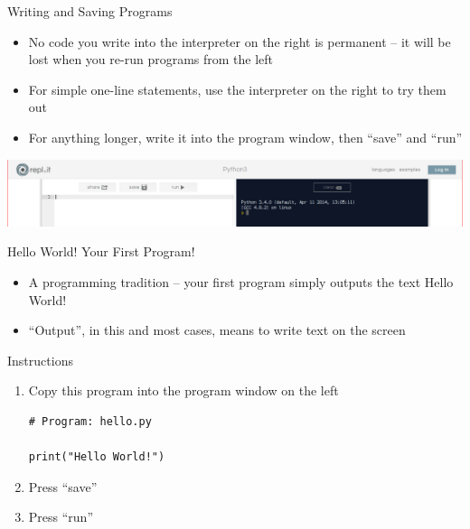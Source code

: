 \begin{frame}{Writing and Saving Programs}
\begin{itemize}
\item No code you write into the interpreter on the right is permanent -- it will be lost when you re-run programs from the left
\item For simple one-line statements, use the interpreter on the right to try them out
\item For anything longer, write it into the program window, then ``save'' and ``run''
\end{itemize}
\begin{center}
\includegraphics[scale=.2]{repl.png}
\end{center}
\end{frame}

\begin{frame}[fragile]{Hello World! Your First Program!}
\begin{itemize}
\item A programming tradition -- your first program simply outputs the text {\ttfamily Hello World!}
\item ``Output'', in this and most cases, means to write text on the screen
\end{itemize}
Instructions
\begin{enumerate}
  \item Copy this program into the program window on the left
\begin{lstlisting}
# Program: hello.py

print("Hello World!")
\end{lstlisting}
\item Press ``save''
\item Press ``run''
  \end{enumerate}
\end{frame}


